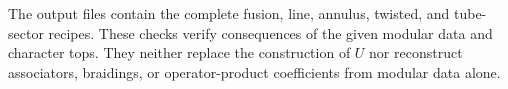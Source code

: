 The output files contain the complete fusion, line, annulus, twisted,
and tube-sector recipes. These checks verify consequences of the
given modular data and character tops. They neither replace the
construction of $U$ nor reconstruct associators, braidings, or
operator-product coefficients from modular data alone.
